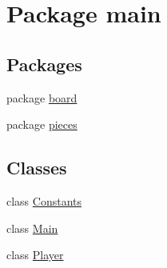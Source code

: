 \hypertarget{namespacemain}{}\section{Package main}
\label{namespacemain}
\subsection*{Packages}
\begin{DoxyCompactItemize}
\item 
package \hyperlink{namespacemain_1_1board}{board}
\item 
package \hyperlink{namespacemain_1_1pieces}{pieces}
\end{DoxyCompactItemize}
\subsection*{Classes}
\begin{DoxyCompactItemize}
\item 
class \hyperlink{classmain_1_1_constants}{Constants}
\item 
class \hyperlink{classmain_1_1_main}{Main}
\item 
class \hyperlink{classmain_1_1_player}{Player}
\end{DoxyCompactItemize}
